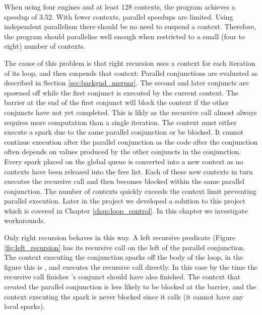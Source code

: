 When using four engines and at least 128 contexts, the program
achieves a speedup of 3.52.
With fewer contexts, parallel speedups are limited.
Using independent parallelism there should be no need to suspend a context.
Therefore, the program should parallelise well enough when restricted to
a small (four to eight) number of contexts.

The cause of this problem is that right recursion uses a context for
each iteration of its loop, and then suspends that context:
Parallel conjunctions are evaluated as described in Section
\ref{sec:backgnd_merpar}.
The second and later conjuncts are spawned off while the first conjunct is
executed by the current context.
The barrier at the end of the first conjunct will block the context if
the other conjuncts have not yet completed.
This is likly as the recursive call almost always requires more
computation than a single iteration.
The context must either execute a spark due to the same parallel
conjunction or be blocked.
It cannot continue execution after the parallel conjunction as the code
after the conjunction often depends on values produced by the other
conjuncts in the conjunction.
Every spark placed on the global queue is converted into a new context
as no contexts have been released into the free list.
Each of these new contexts in turn executes the recursive call and then
becomes blocked within the same parallel conjunction.
The number of contexts quickly exceeds the context limit preventing
parallel execution.
Later in the project we developed a solution to this project which is
covered in Chapter \ref{chap:loop_control}.
In this chapter we investigate workarounds.

Only right recursion behaves in this way.
A left recursive predicate (Figure \ref{fig:left_recursion} has its
recursive call on the left of the parallel conjunction.
The context executing the conjunction sparks off the body of the loop,
in the figure this is ,
and executes the recursive call directly.
In this case by the time the recursive call finishes 's conjunct
should have also finished.
The context that created the parallel conjunction is less likely to be
blocked at the barrier,
and the context executing the spark is never blocked since it calls
\getglobalwork (it cannot have any local sparks).

